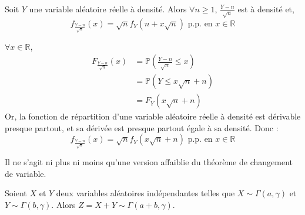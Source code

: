 




	\begin{lemma}
		\label{formule-de-stirling-1}
		Soit $Y$ une variable aléatoire réelle à densité. Alors $\forall n \geq 1$, $\frac{Y - n}{\sqrt{n}}$ est à densité et,
		\[ f_{\frac{Y - n}{\sqrt{n}}}(x) = \sqrt{n} f_{Y}(n + x \sqrt{n}) \text{ p.p. en } x \in \mathbb{R} \]
	\end{lemma}

	\begin{demonstration}
		$\forall x \in \mathbb{R}$,
		\begin{align*}
			F_{\frac{Y - n}{\sqrt{n}}}(x) & = \mathbb{P} \left(\frac{Y - n}{\sqrt{n}} \leq x \right) \\
			&= \mathbb{P} (Y \leq x \sqrt{n} + n) \\
			&= F_Y (x \sqrt{n} + n)
		\end{align*}
		Or, la fonction de répartition d'une variable aléatoire réelle à densité est dérivable presque partout, et sa dérivée est presque partout égale à sa densité. Donc :
		\[ f_{\frac{Y - n}{\sqrt{n}}}(x) = \sqrt{n} f_Y (x \sqrt{n} + n) \text{ p.p. en } x \in \mathbb{R} \]
	\end{demonstration}

	\begin{remark}
		Il ne s'agit ni plus ni moins qu'une version affaiblie du théorème de changement de variable.
	\end{remark}


	\begin{lemma}
		\label{formule-de-stirling-2}
		Soient $X$ et $Y$ deux variables aléatoires indépendantes telles que $X \sim \Gamma(a, \gamma)$ et $Y \sim \Gamma(b, \gamma)$. Alors $Z = X + Y \sim \Gamma(a+b, \gamma)$.
	\end{lemma}

